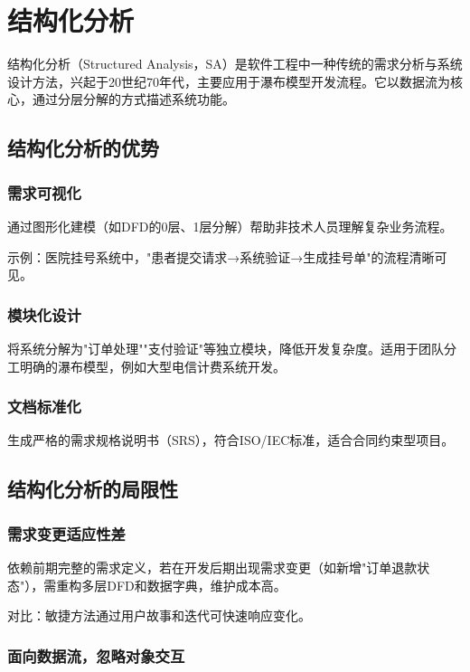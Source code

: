 \section{结构化分析}

结构化分析（Structured Analysis，SA）是软件工程中一种传统的需求分析与系统设计方法，兴起于20世纪70年代，主要应用于瀑布模型开发流程。它以数据流为核心，通过分层分解的方式描述系统功能。

\subsection{结构化分析的优势}

\subsubsection{需求可视化}

通过图形化建模（如DFD的0层、1层分解）帮助非技术人员理解复杂业务流程。

示例：医院挂号系统中，"患者提交请求→系统验证→生成挂号单"的流程清晰可见。

\subsubsection{模块化设计}

将系统分解为"订单处理""支付验证"等独立模块，降低开发复杂度。适用于团队分工明确的瀑布模型，例如大型电信计费系统开发。

\subsubsection{文档标准化}

生成严格的需求规格说明书（SRS），符合ISO/IEC标准，适合合同约束型项目。

\subsection{结构化分析的局限性}

\subsubsection{需求变更适应性差}

依赖前期完整的需求定义，若在开发后期出现需求变更（如新增"订单退款状态"），需重构多层DFD和数据字典，维护成本高。

对比：敏捷方法通过用户故事和迭代可快速响应变化。

\subsubsection{面向数据流，忽略对象交互}

